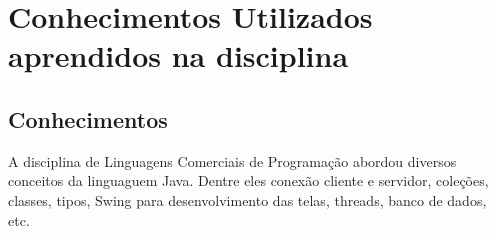 \chapter{Conhecimentos Utilizados aprendidos na disciplina}\label{ch-aula}

\section{Conhecimentos}

A disciplina de Linguagens Comerciais de Programação abordou diversos conceitos da linguaguem Java. Dentre eles conexão cliente e servidor, coleções, classes, tipos, Swing para desenvolvimento das telas, threads, banco de dados, etc.
